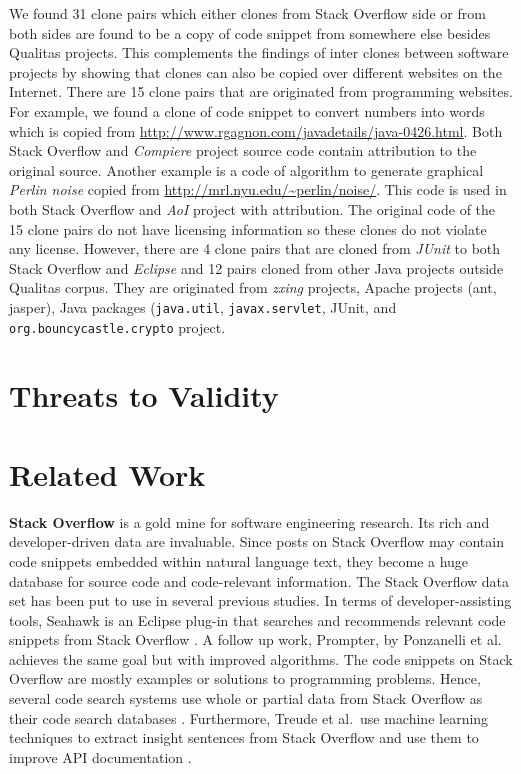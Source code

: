 \documentclass{sig-alternate-05-2015}
\begin{document}
We found 31 clone pairs which either clones from Stack Overflow side or from both sides are found to be a copy of code snippet from somewhere else besides Qualitas projects. This complements the findings of inter clones between software projects \cite{Svajlenko2014} by showing that clones can also be copied over different websites on the Internet. There are 15 clone pairs that are originated from programming websites. For example, we found a clone of code snippet to convert numbers into words which is copied from \url{http://www.rgagnon.com/javadetails/java-0426.html}. Both Stack Overflow and \textit{Compiere} project source code contain attribution to the original source. Another example is a code of algorithm to generate graphical \textit{Perlin noise} copied from \url{http://mrl.nyu.edu/~perlin/noise/}. This code is used in both Stack Overflow and \textit{AoI} project with attribution. The original code of the 15 clone pairs do not have licensing information so these clones do not violate any license. However, there are 4 clone pairs that are cloned from \textit{JUnit} to both Stack Overflow and \textit{Eclipse} and 12 pairs cloned from other Java projects outside Qualitas corpus. They are originated from \textit{zxing} projects, Apache projects (ant, jasper), Java packages (\texttt{java.util}, \texttt{javax.servlet}, JUnit, and \texttt{org.bouncycastle.crypto} project.

\section{Threats to Validity}

\section{Related Work}

\textbf{Stack Overflow} is a gold mine for software engineering research. Its rich and developer-driven data are invaluable. Since posts on Stack Overflow may contain code snippets embedded within natural language text, they become a huge database for source code and code-relevant information. The Stack Overflow data set has been put to use in several previous studies. In terms of developer-assisting tools, Seahawk is an Eclipse plug-in that searches and recommends relevant code snippets from Stack Overflow \cite{Ponzanelli2013}. A follow up work, Prompter, by Ponzanelli et al.~\cite{Ponzanelli2014} achieves the same goal but with improved algorithms. The code snippets on Stack Overflow are mostly examples or solutions to programming problems. Hence, several code search systems use whole or partial data from Stack Overflow as their code search databases \cite{Diamantopoulos2015,Keivanloo2014,Park2014, Stolee2014,Subramanian2013,Diamantopoulos2015}. Furthermore, Treude et al.~use machine learning techniques to extract insight sentences from Stack Overflow and use them to improve API documentation \cite{Treude2016}.
\end{document}
